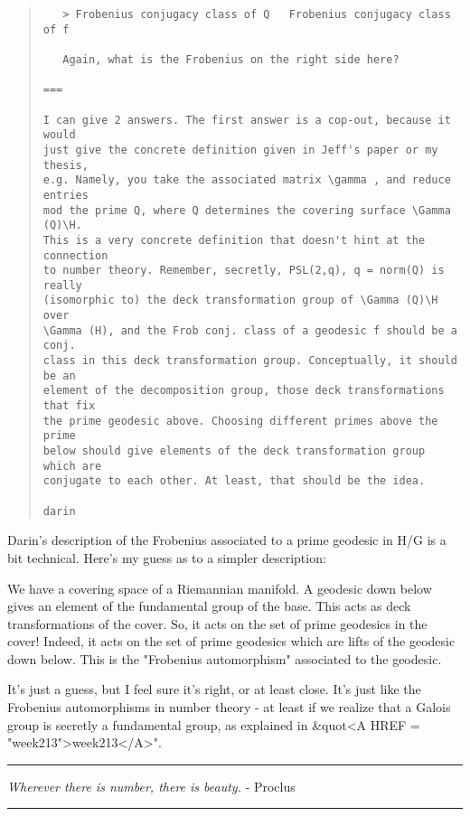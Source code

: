 \begin{quote}
\begin{verbatim}
   > Frobenius conjugacy class of Q   Frobenius conjugacy class of f

   Again, what is the Frobenius on the right side here?

===

I can give 2 answers. The first answer is a cop-out, because it would
just give the concrete definition given in Jeff's paper or my thesis,
e.g. Namely, you take the associated matrix \gamma , and reduce entries
mod the prime Q, where Q determines the covering surface \Gamma (Q)\H.
This is a very concrete definition that doesn't hint at the connection
to number theory. Remember, secretly, PSL(2,q), q = norm(Q) is really
(isomorphic to) the deck transformation group of \Gamma (Q)\H over
\Gamma (H), and the Frob conj. class of a geodesic f should be a conj.
class in this deck transformation group. Conceptually, it should be an
element of the decomposition group, those deck transformations that fix
the prime geodesic above. Choosing different primes above the prime
below should give elements of the deck transformation group which are
conjugate to each other. At least, that should be the idea.

darin

\end{verbatim}
    
\end{quote}

Darin's description of the Frobenius associated to a prime
geodesic in H/G is a bit technical.  Here's my guess as to a simpler
description:

We have a covering space of a Riemannian manifold.  A geodesic down
below gives an element of the fundamental group of the base.  This
acts as deck transformations of the cover.  So, it acts on the set
of prime geodesics in the cover!  Indeed, it acts on the set of
prime geodesics which are lifts of the geodesic down below.
This is the "Frobenius automorphism" associated to the
geodesic.

It's just a guess, but I feel sure it's right, or at least
close.  It's just like the Frobenius automorphisms in number
theory - at least if we realize that a Galois group is secretly
a fundamental group, as explained in &quot<A HREF = "week213">week213</A>".


 



\par\noindent\rule{\textwidth}{0.4pt}
\emph{Wherever there is number, there is beauty.} - Proclus

\par\noindent\rule{\textwidth}{0.4pt}

